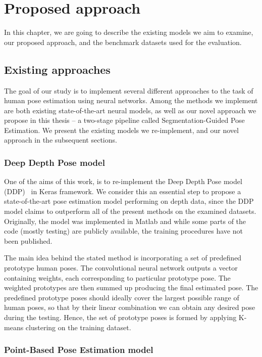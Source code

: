 \chapter{Proposed approach}\label{chap:proposal}
In this chapter, we are going to describe the existing models we aim to examine, our proposed approach, and the benchmark datasets used for the evaluation.


\section{Existing approaches}
The goal of our study is to implement several different approaches to the task of human pose estimation using neural networks. Among the methods we implement are both existing state-of-the-art neural models, as well as our novel approach we propose in this thesis – a two-stage pipeline called Segmentation-Guided Pose Estimation. We present the existing models we re-implement, and our novel approach in the subsequent sections.

\subsection{Deep Depth Pose model}
One of the aims of this work, is to re-implement the Deep Depth Pose model (DDP)~\cite{Marin18jvcir} in Keras framework. We consider this an essential step to propose a state-of-the-art pose estimation model performing on depth data, since the DDP model claims to outperform all of the present methods on the examined datasets. Originally, the model was implemented in Matlab and while some parts of the code (mostly testing) are publicly available, the training procedures have not been published.\par
\vspace{5mm}
\noindent
The main idea behind the stated method is incorporating a set of predefined prototype human poses. The convolutional neural network outputs a vector containing weights, each corresponding to particular prototype pose. The weighted prototypes are then summed up producing the final estimated pose. The predefined prototype poses should ideally cover the largest possible range of human poses, so that by their linear combination we can obtain any desired pose during the testing. Hence, the set of prototype poses is formed by applying K-means clustering on the training dataset.

\subsection{Point-Based Pose Estimation model}

